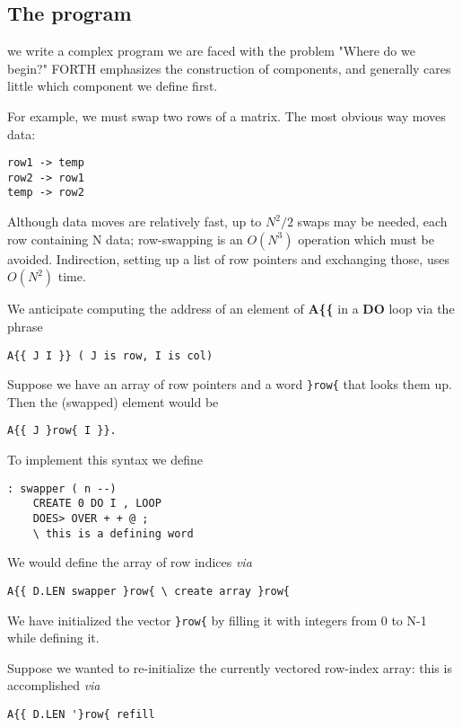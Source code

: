 \subsection{The program}
 we write a complex program we are faced with the problem "Where do we begin?" FORTH emphasizes the construction of components, and generally cares little which component we define first.

For example, we must swap two rows of a matrix. The most
obvious way moves data:

\begin{verbatim}
row1 -> temp
row2 -> row1
temp -> row2
\end{verbatim}

Although data moves are relatively fast, up to $N^2/2$ swaps may be
needed, each row containing N data; row-swapping is an $O(N^3)$
operation which must be avoided. Indirection, setting up a list of
row pointers and exchanging those, uses $O(N^2)$ time.


We anticipate computing the address of an element of \textbf{A\{\{} in a
\textbf{DO} loop via the phrase 
\begin{verbatim}
A{{ J I }} ( J is row, I is col)
\end{verbatim}

Suppose we have an array of row pointers and a word \verb|}row{| that
looks them up. Then the (swapped) element would be
\begin{verbatim}
A{{ J }row{ I }}.
\end{verbatim}

To implement this syntax we define
\begin{verbatim}
: swapper ( n --)
    CREATE 0 DO I , LOOP
    DOES> OVER + + @ ;
    \ this is a defining word
\end{verbatim}
 
We would define the array of row indices \textit{via}

\begin{verbatim}
A{{ D.LEN swapper }row{ \ create array }row{
\end{verbatim}

We have initialized the vector \verb|}row{| by filling it with integers
from 0 to N-1 while defining it.

Suppose we wanted to re-initialize the currently vectored row-index array: this is accomplished \textit{via}

\begin{verbatim}
A{{ D.LEN '}row{ refill 
\end{verbatim}

